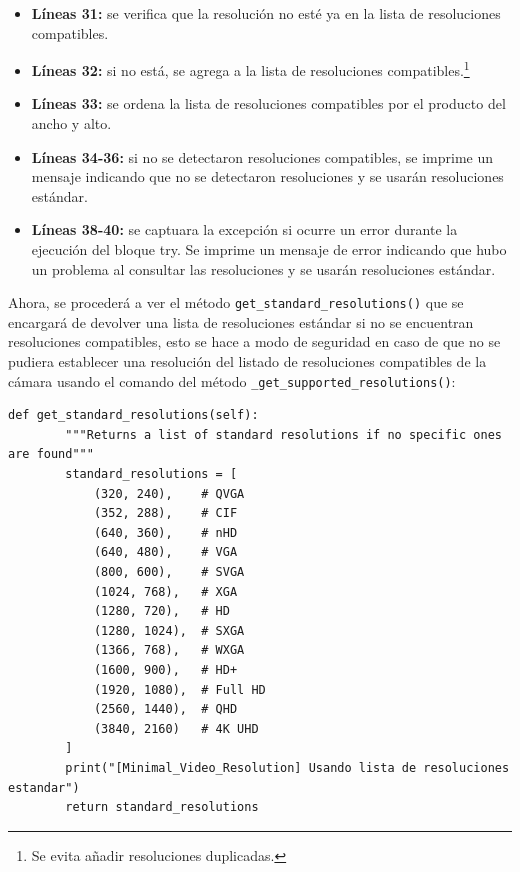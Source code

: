 \begin{itemize}
    \item \textbf{Líneas 31:} se verifica que la resolución no esté ya en la lista de resoluciones compatibles. 
    \item \textbf{Líneas 32:} si no está, se agrega a la lista de resoluciones compatibles.\footnote{Se evita añadir resoluciones duplicadas.}
    \item \textbf{Líneas 33:} se ordena la lista de resoluciones compatibles por el producto del ancho y alto.
    \item \textbf{Líneas 34-36:} si no se detectaron resoluciones compatibles, se imprime un mensaje indicando que no se detectaron resoluciones y se usarán resoluciones estándar.
    \item \textbf{Líneas 38-40:} se captuara la excepción si ocurre un error durante la ejecución del bloque try. Se imprime un mensaje de error indicando que hubo un problema al consultar las resoluciones y se usarán resoluciones estándar.
\end{itemize}
\vspace{\baselineskip}

Ahora, se procederá a ver el método \texttt{get\_standard\_resolutions()} que se encargará de devolver una lista de resoluciones estándar si no se encuentran resoluciones compatibles, esto se hace a modo de seguridad en caso de que no se pudiera establecer una resolución del listado de resoluciones compatibles de la cámara usando el comando del método \texttt{\_get\_supported\_resolutions()}:
\begin{lstlisting}[style=pythonstyle, caption={Método \texttt{get\_standard\_resolutions()} de \textit{Minimal\_Video\_Resolution}.}, label={lst:get_standard_resolutions_minimal_video_resolution}]
def get_standard_resolutions(self):
        """Returns a list of standard resolutions if no specific ones are found"""
        standard_resolutions = [
            (320, 240),    # QVGA
            (352, 288),    # CIF
            (640, 360),    # nHD
            (640, 480),    # VGA
            (800, 600),    # SVGA
            (1024, 768),   # XGA
            (1280, 720),   # HD
            (1280, 1024),  # SXGA
            (1366, 768),   # WXGA
            (1600, 900),   # HD+
            (1920, 1080),  # Full HD
            (2560, 1440),  # QHD
            (3840, 2160)   # 4K UHD
        ]
        print("[Minimal_Video_Resolution] Usando lista de resoluciones estandar")
        return standard_resolutions
\end{lstlisting}
\vspace{\baselineskip}

